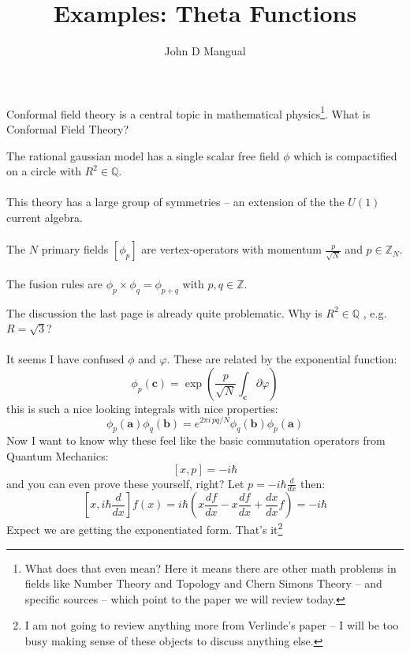 \documentclass[12pt]{article}
\title{\textbf{ Examples:  Theta Functions}}
\author{John D Mangual}
\date{}
\begin{document}
\selectfont \fontsize{25}{30}\selectfont

\maketitle

\noindent  Conformal field theory is a central topic in mathematical physics\footnote{What does that even mean?  Here it means there are other math problems  in fields like Number Theory and Topology and Chern Simons Theory -- and specific sources -- which point to the paper we will review today. }.  What is Conformal Field Theory? \\
The rational gaussian model has a single scalar free field $\phi$ which is compactified on a circle with $R^2 \in \mathbb{Q}$.  \\ \\
This theory has a large group of symmetries -- an extension of the the $U(1)$ current algebra. \\ \\
The $N$ primary fields $[\phi_p]$ are vertex-operators with momentum $\frac{p}{\sqrt{N}}$ and $p \in \mathbb{Z}_N$. \\ \\
The fusion rules are $\phi_p \times \phi_q = \phi_{p+q}$ with $p,q \in \mathbb{Z}$.

\newpage

\noindent The discussion the last page is already quite problematic.  Why is $R^2 \in \mathbb{Q}$ , e.g. $R = \sqrt{3}$? \\ \\
It seems I have confused $\phi$ and $\varphi$.  These are related by the exponential function:
$$ \phi_p ( \textbf{c} )
= \exp \left( \frac{p}{\sqrt{N}} 
\int_\textbf{c} \partial \varphi \right)$$
this is such a nice looking integrals with nice properties:
$$ 
\phi_p ( \textbf{a} )
\phi_q ( \textbf{b} )
= 
e^{ 2\pi i \, pq/N}
\phi_q ( \textbf{b} )
\phi_p ( \textbf{a} )
$$
Now I want to know why these feel like the basic commutation operators from Quantum Mechanics:
$$ [x, p] = -i \hbar $$
and you can even prove these yourself, right? Let $p = -i\hbar \frac{d}{dx}$ then:
$$ \left[ x, i\hbar \frac{d}{dx} \right]f(x)
= i\hbar \left( x \frac{df}{dx}  - 
x\frac{df}{dx} + \frac{dx}{dx}f\right) = -i\hbar $$
Expect we are getting the exponentiated form.  That's it\footnote{I am not going to review anything more from Verlinde's paper -- I will be too busy making sense of these objects to discuss anything else.}
\end{document}
